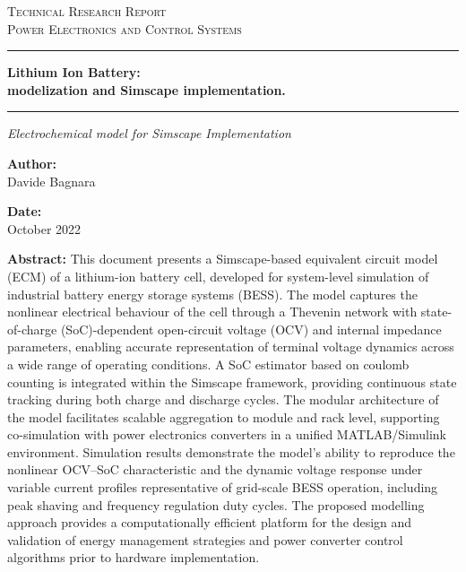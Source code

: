 \documentclass[12pt,a4paper]{scrartcl}
\newcommand{\DocCategory}{Technical Research Report}
\newcommand{\DocField}{Power Electronics and Control Systems}
\newcommand{\DocTitle}{%
	{\fontsize{20}{24}\selectfont\bfseries Lithium Ion Battery:} \\[16pt]
	{\fontsize{16}{20}\selectfont\bfseries modelization and Simscape implementation.}
}
\newcommand{\DocSubtitle}{%
	Electrochemical model for Simscape Implementation
}
\newcommand{\DocAuthor}{Davide Bagnara}
\newcommand{\DocDate}{October 2022}
\newcommand{\DocAbstract}{%
	This document presents a Simscape-based equivalent circuit model (ECM) of a lithium-ion battery cell, developed for system-level simulation of industrial battery energy storage systems (BESS). The model captures the nonlinear electrical behaviour of the cell through a Thevenin network with state-of-charge (SoC)-dependent open-circuit voltage (OCV) and internal impedance parameters, enabling accurate representation of terminal voltage dynamics across a wide range of operating conditions. A SoC estimator based on coulomb counting is integrated within the Simscape framework, providing continuous state tracking during both charge and discharge cycles. The modular architecture of the model facilitates scalable aggregation to module and rack level, supporting co-simulation with power electronics converters in a unified MATLAB/Simulink environment. Simulation results demonstrate the model's ability to reproduce the nonlinear OCV–SoC characteristic and the dynamic voltage response under variable current profiles representative of grid-scale BESS operation, including peak shaving and frequency regulation duty cycles. The proposed modelling approach provides a computationally efficient platform for the design and validation of energy management strategies and power converter control algorithms prior to hardware implementation.
}
\begin{document}
	\titlepage
	\begin{center}
		{\Large\scshape \DocCategory}\\[8pt]
		{\large\scshape \DocField}
	\end{center}
	
	\vspace{36pt}
	\noindent\rule{\linewidth}{0.8pt}
	
	\begin{center}
		{\fontsize{30}{30}\selectfont\bfseries \DocTitle}
	\end{center}
	
	\vspace{4pt}
	\noindent\rule{\linewidth}{2.2pt}
	
	\begin{center}
		\begin{onehalfspace}
			{\large\itshape \DocSubtitle}
		\end{onehalfspace}
	\end{center}
	
	\vspace{36pt}
	
	\begin{minipage}{0.92\linewidth}
		\noindent
		\begin{minipage}[t]{0.48\linewidth}
			\textbf{Author:}\\[2pt]
			\DocAuthor
		\end{minipage}%
		\hfill
		\begin{minipage}[t]{0.48\linewidth}
			\raggedleft
			\textbf{Date:}\\[2pt]
			\DocDate
		\end{minipage}
	\end{minipage}
	\vspace{36pt}
	
	\begin{center}
		\begin{minipage}{0.85\linewidth}
			\footnotesize 
			\begin{onehalfspace}
				\textbf{Abstract:} \DocAbstract
			\end{onehalfspace}
		\end{minipage}
	\end{center}
	
\end{document}
